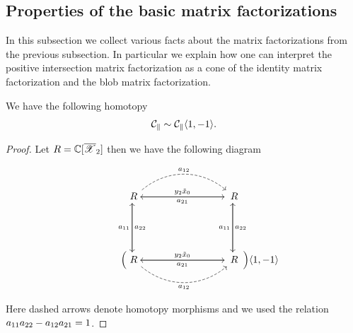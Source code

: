 \subsection{Properties of the basic matrix factorizations}
In this subsection we collect various facts about the matrix factorizations from the previous subsection. In particular we explain how one can interpret
the positive intersection matrix factorization as a cone of the identity matrix factorization and the blob matrix factorization.

\begin{proposition} We have the following homotopy
\[
\mathcal{C}_{\parallel}\sim \mathcal{C}_{\parallel}\langle 1,-1 \rangle.
\]
\end{proposition}
\begin{proof} Let \(R=\mathbb{C}[\overline{\mathscr{X}}_2]\) then we have
 the following diagram



\begin{equation*}
\begin{tikzcd}[column sep=3cm, row sep=1.75cm]
&
\rgR
\arrow[xshift=-0.35ex]{r}{\yt\txz}
\arrow[xshift=-0.35ex]{d}{\exatt}
\arrow[dashed, bend left=40]{r}{\exaot}
&
\rgR
\arrow[xshift=-0.35ex]{l}{\exato}
\arrow[xshift=-0.35ex]{d}{\exatt}
&
\\
\vphantom{1mm}
&
\rgR
\arrow[phantom,pos=0.02]{l}{\Bigl(}
\arrow[xshift=-0.35ex]{r}{\yt\txz}
\arrow[xshift=-0.35ex]{u}{\exaoo}
\arrow[bend right=40,dashed,']{r}{\exaot}
&
\rgR
\arrow[phantom,pos=0.22]{r}{\Bigr)\brwsh{1}{-1}}
\arrow [xshift=-0.35ex]{l}{\exato}
\arrow[xshift=-0.35ex]{u}{\exaoo}
&
\vphantom{1mm}
\end{tikzcd}
\end{equation*}




Here dashed arrows denote homotopy morphisms and we used the relation
$a_{11}a_{22} - a_{12}a_{21} = 1$.
\end{proof}

